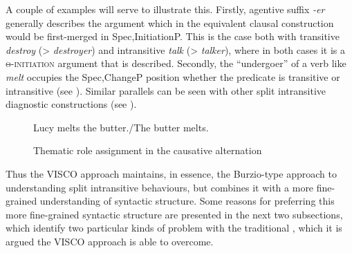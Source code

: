 \documentclass[output=paper]{langsci/langscibook}
\begin{document}
A couple of examples will serve to illustrate this. Firstly, agentive suffix
\emph{{}-er} generally describes the argument which in the equivalent clausal
construction would be first-merged in Spec,InitiationP. This is the case both
with transitive \emph{destroy} (> \emph{destroyer}) and intransitive
\emph{talk} (> \emph{talker}), where in both cases it is a
\textsc{θ-initiation} argument that is described. Secondly, the
\enquote{undergoer} of a verb like \emph{melt} occupies the Spec,ChangeP
position whether the predicate is transitive or intransitive (see ). Similar parallels can be seen with other split intransitive diagnostic
constructions (see \citealt{Baker2018,Baker2019}).

\begin{figure}
\caption{Thematic role assignment in the causative alternation\label{fig:baker:3}}
\raggedright Lucy melts the butter.\slash The butter melts.\medskip\\
\end{figure}

Thus the VISCO approach maintains, in essence, the Burzio-type approach to
understanding split intransitive behaviours, but combines it with a more
fine-grained understanding of syntactic structure. Some reasons for preferring
this more fine-grained syntactic structure are presented in the next two
subsections, which identify two particular kinds of problem with the
traditional , which it is argued the VISCO approach is
able to overcome.
\end{document}
